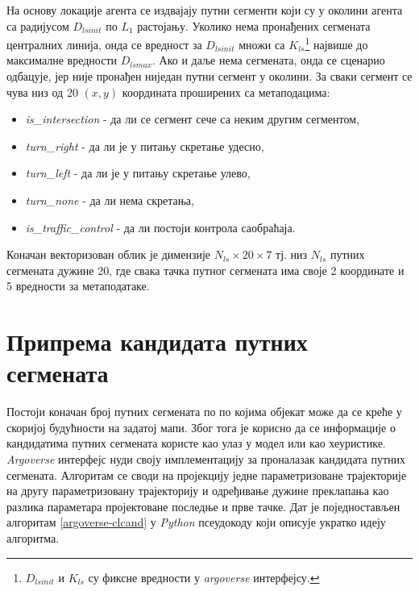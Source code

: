 \documentclass[11pt,oneside]{memoir}
\begin{document}
На основу локације агента се издвајају путни сегменти који су у околини агента са радијусом $D_{lsinit}$ по $L_1$ растојању. 
Уколико нема пронађених сегмената централних линија, онда се вредност за $D_{lsinit}$ множи са $K_{ls}$\footnote{$D_{lsinit}$ и $K_{ls}$ су фиксне вредности
у \textit{argoverse} интерфејсу.} највише до максималне вредности $D_{lsmax}$. Ако и даље нема сегмената, 
онда се сценарио одбацује, јер није пронађен ниједан путни сегмент у околини. 
За сваки сегмент се чува низ од 20 $(x, y)$ координата проширених са метаподацима:
\begin{itemize} 
  \item \textit{is\_intersection} - да ли се сегмент сече са неким другим сегментом,
  \item \textit{turn\_right} - да ли је у питању скретање удесно, 
  \item \textit{turn\_left} - да ли је у питању скретање улево, 
  \item \textit{turn\_none} - да ли нема скретања, 
  \item \textit{is\_traffic\_control} - да ли постоји контрола саобраћаја. 
\end{itemize}
Коначан векторизован облик је димензије $N_{ls}\times 20\times 7$ тј. низ $N_{ls}$ путних сегмената дужине 20, где свака тачка путног сегмената има своје 2 координате
и 5 вредности за метаподатаке. 

\section{Припрема кандидата путних сегмената}

Постоји коначан број путних сегмената по по којима
објекат може да се креће у скоријој будућности на задатој мапи. Због тога је корисно да се информације о кандидатима путних сегмената
користе као улаз у модел или као хеуристике.
\textit{Argoverse} интерфејс нуди своју имплементацију
за проналазак кандидата путних сегмената. Алгоритам се своди на пројекцију једне параметризоване трајекторије на другу параметризовану трајекторију и 
одређивање дужине преклапања као разлика параметара пројектоване последње и прве тачке. Дат је поједностављен алгоритам \ref{argoverse-clcand} у \textit{Python} 
псеудокоду који описује укратко идеју алгоритма.
\end{document}
